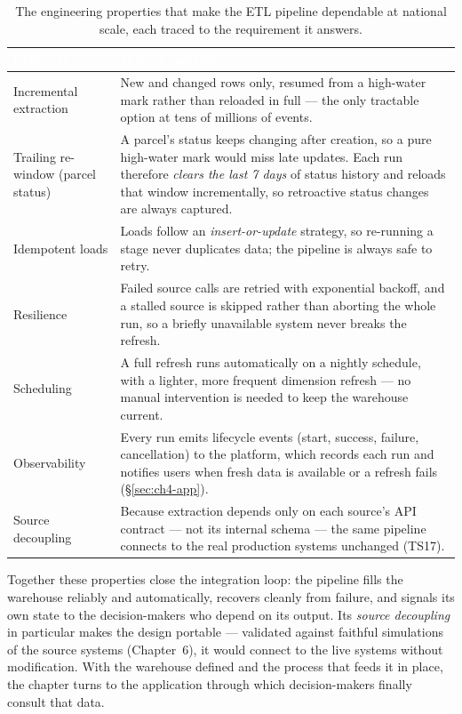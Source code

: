 \begin{table}[H]
\centering
\caption{The engineering properties that make the ETL pipeline dependable at national scale, each traced
to the requirement it answers.}
\label{tab:ch4-etl-properties}
\renewcommand{\arraystretch}{1.35}
\begin{tabularx}{\linewidth}{|>{\raggedright\arraybackslash}p{3.7cm}|>{\raggedright\arraybackslash}X|}
\hline
\rowcolor{tblheader}
\textcolor{white}{\textbf{Property}} & \textcolor{white}{\textbf{Why it matters}} \\
\hline
Incremental extraction & New and changed rows only, resumed from a high-water mark rather than reloaded
in full --- the only tractable option at tens of millions of events. \\
Trailing re-window (parcel status) & A parcel's status keeps changing after creation, so a pure
high-water mark would miss late updates. Each run therefore \emph{clears the last 7 days} of status
history and reloads that window incrementally, so retroactive status changes are always captured. \\
Idempotent loads & Loads follow an \emph{insert-or-update} strategy, so re-running a stage never
duplicates data; the pipeline is always safe to retry. \\
Resilience & Failed source calls are retried with exponential backoff, and a stalled source is skipped
rather than aborting the whole run, so a briefly unavailable system never breaks the refresh. \\
Scheduling & A full refresh runs automatically on a nightly schedule, with a lighter, more frequent
dimension refresh --- no manual intervention is needed to keep the warehouse current. \\
Observability & Every run emits lifecycle events (start, success, failure, cancellation) to the
platform, which records each run and notifies users when fresh data is available or a refresh fails
(\S\ref{sec:ch4-app}). \\
Source decoupling & Because extraction depends only on each source's API contract --- not its internal
schema --- the same pipeline connects to the real production systems unchanged (TS17). \\
\hline
\end{tabularx}
\end{table}

Together these properties close the integration loop: the pipeline fills the warehouse reliably and
automatically, recovers cleanly from failure, and signals its own state to the decision-makers who
depend on its output. Its \emph{source decoupling} in particular makes the design portable --- validated
against faithful simulations of the source systems (Chapter~6), it would connect to the live systems
without modification. With the warehouse defined and the process that feeds it in place, the chapter
turns to the application through which decision-makers finally consult that data.

